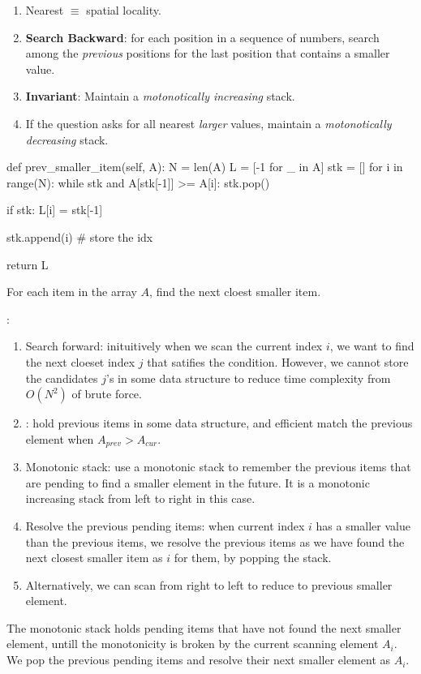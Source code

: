 \begin{enumerate}
\item Nearest $\equiv$ spatial locality.
\item \textbf{Search Backward}: for each position in a sequence of numbers, search among the \textit{previous} positions for the last position that contains a smaller value. 
\item \textbf{Invariant}: Maintain a \textit{motonotically increasing} stack.  
\item If the question asks for all nearest \textit{larger} values, maintain a \textit{motonotically decreasing} stack.  
\end{enumerate}

\begin{python}
def prev_smaller_item(self, A):
    N = len(A)
    L = [-1 for _ in A]
    stk = []
    for i in range(N):
        while stk and A[stk[-1]] >= A[i]:
            stk.pop()

        if stk:
            L[i] = stk[-1]
            
        stk.append(i)  # store the idx

    return L
\end{python}

 For each item in the array $A$, find the next cloest smaller item. 

:
\begin{enumerate}
\item Search forward: inituitively when we scan the current index $i$, we want to find the next cloeset index $j$ that satifies the condition. However, we cannot store the candidates $j$'s in some data structure to reduce time complexity from $O(N^2)$ of brute force. 
\item {}: hold previous items in some data structure, and efficient match the previous element when $A_{prev} > A_{cur}$.
\item Monotonic stack: use a monotonic stack to remember the previous items that are pending to find a smaller element in the future. It is a monotonic increasing stack from left to right in this case. 
\item Resolve the previous pending items: when current index $i$ has a smaller value than the previous items, we resolve the previous items as we have found the next closest smaller item as $i$ for them, by popping the stack. 
\item Alternatively, we can scan from right to left to reduce to previous smaller element. 
\end{enumerate}
The monotonic stack holds pending items that have not found the next smaller element, untill the monotonicity is broken by the current scanning element $A_i$. We pop the previous pending items and resolve their next smaller element as $A_i$. 

